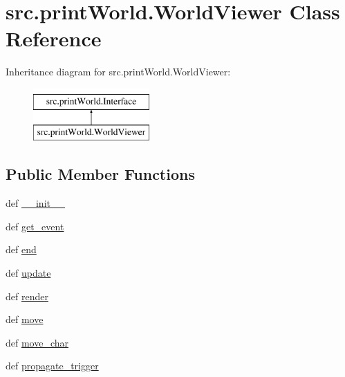\hypertarget{classsrc_1_1print_world_1_1_world_viewer}{\section{src.\-print\-World.\-World\-Viewer \-Class \-Reference}
\label{classsrc_1_1print_world_1_1_world_viewer}
}
\-Inheritance diagram for src.\-print\-World.\-World\-Viewer\-:\begin{figure}[H]
\begin{center}
\leavevmode
\includegraphics[height=2.000000cm]{classsrc_1_1print_world_1_1_world_viewer}
\end{center}
\end{figure}
\subsection*{\-Public \-Member \-Functions}
\begin{DoxyCompactItemize}
\item 
def \hyperlink{classsrc_1_1print_world_1_1_world_viewer_a7a2696805539e858a95ee4cf45eaf1c7}{\-\_\-\-\_\-init\-\_\-\-\_\-}
\item 
def \hyperlink{classsrc_1_1print_world_1_1_world_viewer_a13a6b8596015312e1fde150640ac542e}{get\-\_\-event}
\item 
def \hyperlink{classsrc_1_1print_world_1_1_world_viewer_a1c80356e21e257f8a9f6f123b1c9970d}{end}
\item 
def \hyperlink{classsrc_1_1print_world_1_1_world_viewer_aa39257d89f22103040677719c3f8e90e}{update}
\item 
def \hyperlink{classsrc_1_1print_world_1_1_world_viewer_a6bf228bb9cd15d34ef19c624fdc79c68}{render}
\item 
def \hyperlink{classsrc_1_1print_world_1_1_world_viewer_a4f40dfbf0e262ffbe723900a2f5cbe4f}{move}
\item 
def \hyperlink{classsrc_1_1print_world_1_1_world_viewer_ae16b4b78785490c05644cd54fa2fd88a}{move\-\_\-char}
\item 
def \hyperlink{classsrc_1_1print_world_1_1_world_viewer_a4126bfb1941eece5f72ecc7e7a20f4c2}{propagate\-\_\-trigger}
\end{DoxyCompactItemize}
